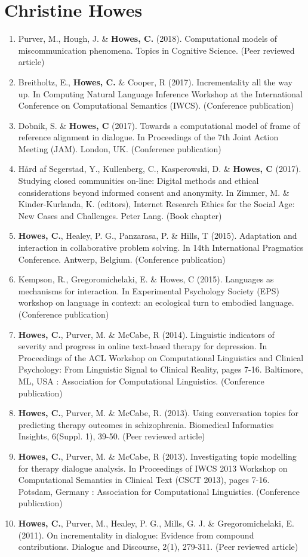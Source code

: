 \documentclass{article}
\begin{document}
\newpage
{}
\section*{Christine Howes}
\begin{enumerate}
\item Purver, M., Hough, J. \& \textbf{Howes, C.} (2018). Computational models of miscommunication phenomena. Topics in Cognitive Science. (Peer reviewed article)
\item Breitholtz, E., \textbf{Howes, C.} \& Cooper, R (2017). Incrementality all the way up. In Computing Natural Language Inference Workshop at the International Conference on Computational Semantics (IWCS). (Conference publication)
\item Dobnik, S. \& \textbf{Howes, C} (2017). Towards a computational model of frame of reference alignment in dialogue. In Proceedings of the 7th Joint Action Meeting (JAM). London, UK. (Conference publication)
\item Hård af Segerstad, Y., Kullenberg, C., Kasperowski, D. \& \textbf{Howes, C} (2017). Studying closed communities on-line: Digital methods and ethical considerations beyond informed consent and anonymity. In Zimmer, M. \& Kinder-Kurlanda, K. (editors), Internet Research Ethics for the Social Age: New Cases and Challenges. Peter Lang. (Book chapter)
\item \textbf{Howes, C.}, Healey, P. G., Panzarasa, P. \& Hills, T (2015). Adaptation and interaction in collaborative problem solving. In 14th International Pragmatics Conference. Antwerp, Belgium. (Conference publication)
\item Kempson, R., Gregoromichelaki, E. \& {Howes, C} (2015). Languages as mechanisms for interaction. In Experimental Psychology Society (EPS) workshop on language in context: an ecological turn to embodied language. (Conference publication)
\item \textbf{Howes, C.}, Purver, M. \& McCabe, R (2014). Linguistic indicators of severity and progress in online text-based therapy for depression. In Proceedings of the ACL Workshop on Computational Linguistics and Clinical Psychology: From Linguistic Signal to Clinical Reality, pages 7-16. Baltimore, ML, USA : Association for Computational Linguistics. (Conference publication)
\item \textbf{Howes, C.}, Purver, M. \& McCabe, R. (2013). Using conversation topics for predicting therapy outcomes in schizophrenia. Biomedical Informatics Insights, 6(Suppl. 1), 39-50. (Peer reviewed article)
\item \textbf{Howes, C.}, Purver, M. \& McCabe, R (2013). Investigating topic modelling for therapy dialogue analysis. In Proceedings of IWCS 2013 Workshop on Computational Semantics in Clinical Text (CSCT 2013), pages 7-16. Potsdam, Germany : Association for Computational Linguistics. (Conference publication)

\item \textbf{Howes, C.}, Purver, M., Healey, P. G., Mills, G. J. \& Gregoromichelaki, E. (2011). On incrementality in dialogue: Evidence from compound contributions. Dialogue and Discourse, 2(1), 279-311. (Peer reviewed article)
\end{enumerate}
\end{document}
